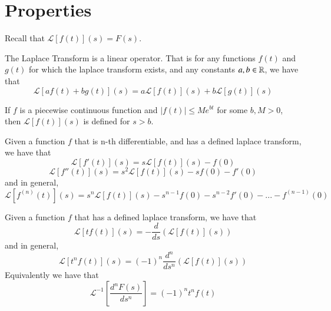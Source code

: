 \documentclass[12pt, a4paper, oneside, openright, titlepage]{book}
\begin{document}
\section{Properties}

Recall that $\mathcal{L}[f(t)](s) = F(s)$.

\begin{props}[Linearity]
        The Laplace Transform is a linear operator. That is for any functions $f(t)$ and $g(t)$ for which the laplace transform exists, and any constants $a,b \in \mathbb R$, we have that \begin{equation}
                \mathcal{L}[af(t)+bg(t)](s)=a\mathcal{L}[f(t)](s)+b\mathcal{L}[g(t)](s)
        \end{equation}
\end{props}




\begin{props}[Defined]
        If $f$ is a piecewise continuous function and $|f(t)| \leq Me^{bt}$ for some $b,M > 0$, then $\mathcal{L}[f(t)](s)$ is defined for $s > b$.
\end{props}




\begin{props}
        Given a function $f$ that is n-th differentiable, and has a defined laplace transform, we have that \begin{equation}
                \mathcal{L}[f'(t)](s) = s\mathcal{L}[f(t)](s) - f(0) 
        \end{equation}
        \begin{equation}
                \mathcal{L}[f''(t)](s) = s^2\mathcal{L}[f(t)](s) - sf(0) - f'(0)
        \end{equation}
        and in general,  \begin{equation}
                \mathcal{L}[f^{(n)}(t)](s) = s^n\mathcal{L}[f(t)](s) - s^{n-1}f(0) - s^{n-2}f'(0) - ... - f^{(n-1)}(0) 
        \end{equation}
\end{props}




\begin{props}
        Given a function $f$ that has a defined laplace transform, we have that \begin{equation}
                \mathcal{L}[tf(t)](s) = -\frac{d}{ds}\left(\mathcal{L}[f(t)](s)\right)
        \end{equation}
        and in general, \begin{equation}
                \mathcal{L}[t^nf(t)](s) = (-1)^n\frac{d^n}{ds^n}\left(\mathcal{L}[f(t)](s)\right)
        \end{equation}
        Equivalently we have that \begin{equation}
                \mathcal{L}^{-1}\left[\frac{d^nF(s)}{ds^n}\right] = (-1)^nt^nf(t)
        \end{equation}
\end{props}
\end{document}
